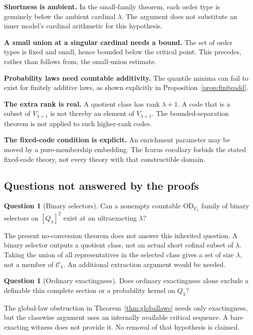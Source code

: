 \documentclass[11pt,letterpaper]{article}
\theoremstyle{definition}
\newtheorem{question}[definition]{Question}
\numberwithin{equation}{section}
\newcommand{\OD}{\mathrm{OD}}
\begin{document}
\textbf{Shortness is ambient.} In the small-family theorem, each order type is genuinely below the ambient cardinal $\lambda$. The argument does not substitute an inner model's cardinal arithmetic for this hypothesis.

\textbf{A small union at a singular cardinal needs a bound.} The set of order types is fixed and small, hence bounded below the critical point. This precedes, rather than follows from, the small-union estimate.

\textbf{Probability laws need countable additivity.} The quantile minima can fail to exist for finitely additive laws, as shown explicitly in Proposition~\ref{prop:finiteadd}.

\textbf{The extra rank is real.} A quotient class has rank $\lambda+1$. A code that is a subset of $V_{\lambda+1}$ is not thereby an element of $V_{\lambda+1}$. The bounded-separation theorem is not applied to such higher-rank codes.

\textbf{The fixed-code condition is explicit.} An enrichment parameter may be moved by a pure-membership embedding. The Icarus corollary forbids the stated fixed-code theory, not every theory with that constructible domain.

\subsection{Questions not answered by the proofs}

\begin{question}[Binary selectors]
Can a nonempty countable $\OD_{V_\lambda}$ family of binary selectors on $[Q_\lambda]^2$ exist at an ultraexacting $\lambda$?
\end{question}
The present no-conversion theorem does not answer this inherited question. A binary selector outputs a quotient class, not an actual short cofinal subset of $\lambda$. Taking the union of all representatives in the selected class gives a set of size $\lambda$, not a member of $\mathcal C_\lambda$. An additional extraction argument would be needed.

\begin{question}[Ordinary exactingness]
Does ordinary exactingness alone exclude a definable thin complete section or a probability kernel on $Q_\lambda$?
\end{question}
The global-law obstruction in Theorem~\ref{thm:globallaws} needs only exactingness, but the classwise argument uses an internally available critical sequence. A bare exacting witness does not provide it. No removal of that hypothesis is claimed.
\end{document}
